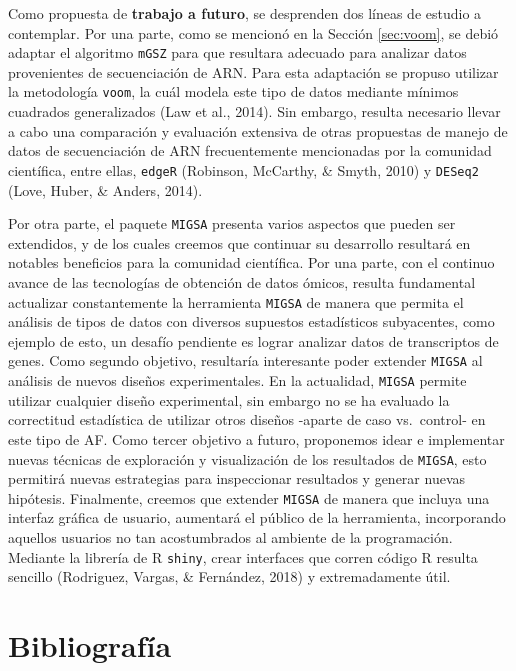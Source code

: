 \documentclass[12pt,twoside]{reedthesis}
\begin{document}
\par

Como propuesta de \textbf{trabajo a futuro}, se desprenden dos líneas de estudio a contemplar. Por una parte, como se mencionó en la Sección \ref{sec:voom}, se debió adaptar el algoritmo \texttt{mGSZ} para que resultara adecuado para analizar datos provenientes de secuenciación de ARN. Para esta adaptación se propuso utilizar la metodología \texttt{voom}, la cuál modela este tipo de datos mediante mínimos cuadrados generalizados (Law et al., 2014). Sin embargo, resulta necesario llevar a cabo una comparación y evaluación extensiva de otras propuestas de manejo de datos de secuenciación de ARN frecuentemente mencionadas por la comunidad científica, entre ellas, \texttt{edgeR} (Robinson, McCarthy, \& Smyth, 2010) y \texttt{DESeq2} (Love, Huber, \& Anders, 2014).

\par

Por otra parte, el paquete \texttt{MIGSA} presenta varios aspectos que pueden ser extendidos, y de los cuales creemos que continuar su desarrollo resultará en notables beneficios para la comunidad científica. Por una parte, con el continuo avance de las tecnologías de obtención de datos ómicos, resulta fundamental actualizar constantemente la herramienta \texttt{MIGSA} de manera que permita el análisis de tipos de datos con diversos supuestos estadísticos subyacentes, como ejemplo de esto, un desafío pendiente es lograr analizar datos de transcriptos de genes. Como segundo objetivo, resultaría interesante poder extender \texttt{MIGSA} al análisis de nuevos diseños experimentales. En la actualidad, \texttt{MIGSA} permite utilizar cualquier diseño experimental, sin embargo no se ha evaluado la correctitud estadística de utilizar otros diseños -aparte de caso vs.~control- en este tipo de AF. Como tercer objetivo a futuro, proponemos idear e implementar nuevas técnicas de exploración y visualización de los resultados de \texttt{MIGSA}, esto permitirá nuevas estrategias para inspeccionar resultados y generar nuevas hipótesis. Finalmente, creemos que extender \texttt{MIGSA} de manera que incluya una interfaz gráfica de usuario, aumentará el público de la herramienta, incorporando aquellos usuarios no tan acostumbrados al ambiente de la programación. Mediante la librería de R \texttt{shiny}, crear interfaces que corren código R resulta sencillo (Rodriguez, Vargas, \& Fernández, 2018) y extremadamente útil.

\hypertarget{bibliografuxeda}{%
\chapter*{Bibliografía}\label{bibliografuxeda}}
\end{document}
